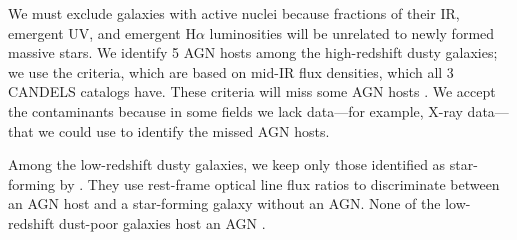 \documentclass[preprint]{aastex}
\begin{document}
We must exclude galaxies with active nuclei because fractions of their IR,
emergent UV, and emergent H$\alpha$ luminosities will be unrelated to newly
formed massive stars.  We identify 5 AGN hosts among the high-redshift dusty
galaxies; we use the \citet{donley12} criteria, which are based on mid-IR flux
densities, which all 3 CANDELS catalogs have.  These criteria will miss some
AGN hosts \citep{juneau13}.  We accept the contaminants because in some fields
we lack data---for example, X-ray data---that we could use to identify the
missed AGN hosts.

Among the low-redshift dusty
galaxies, we keep only those identified as star-forming by \citet{hwang13}.
They use rest-frame optical line flux ratios to discriminate between an AGN host
and a star-forming galaxy without an AGN.  None of the low-redshift dust-poor
galaxies host an AGN \citep{overzier11}.
\end{document}
